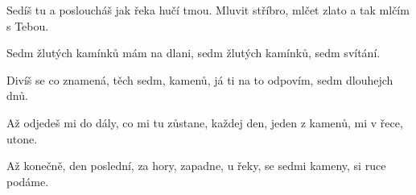 
\beginverse{}
Sedíš tu a posloucháš
jak řeka hučí tmou.
Mluvit stříbro, mlčet zlato
a tak mlčím s Tebou.
\endverse{}

\beginchorus{}
Sedm žlutých kamínků mám na dlani,
sedm žlutých kamínků, sedm svítání.
\endchorus{}

\beginverse{}
Divíš se co znamená,
těch sedm, kamenů,
já ti na to odpovím,
sedm dlouhejch dnů.
\endverse{}

\beginchorus{}
\phantom{}
\endchorus{}

\beginverse{}
Až odjedeš mi do dály,
co mi tu zůstane,
každej den, jeden z kamenů,
mi v řece, utone.
\endverse{}

\beginchorus{}
\phantom{}
\endchorus{}

\beginverse{}
Až konečně, den poslední,
za hory, zapadne,
u řeky, se sedmi kameny,
si ruce podáme.
\endverse{}

\beginchorus{}
\phantom{}
\endchorus{}

\endsong{}
